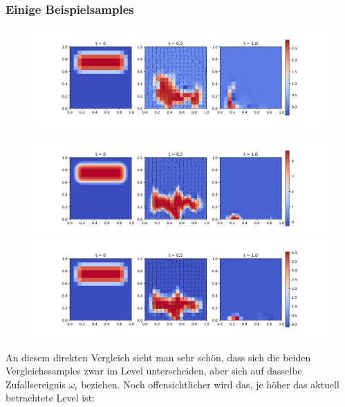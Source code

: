 \subsubsection{Einige Beispielsamples}
\begin{figure}[H]
	\centering
	\includegraphics[width=\textwidth]{plots/sample_4_1.png} 
\end{figure}
\begin{figure}[H]
	\centering
	\includegraphics[width=\textwidth]{plots/sample_5_1.png} 
	\includegraphics[width=\textwidth]{plots/sample_coarse_5_1.png} 
\end{figure}
An diesem direkten Vergleich sieht man sehr schön, dass sich die beiden Vergleichssamples zwar im Level unterscheiden, aber sich auf dasselbe Zufallsereignis $ \omega_i $ beziehen. Noch offensichtlicher wird das, je höher das aktuell betrachtete Level ist:
